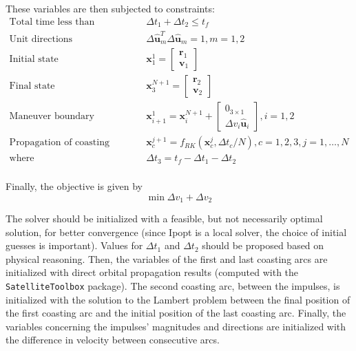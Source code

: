 These variables are then subjected to constraints:
\begin{align}
    \text{Total time less than transfer time} &\qquad\Delta t_1 + \Delta t_2 \leq t_f \\
    \text{Unit directions} &\qquad\Delta \hat{\mathbf{u}}_m^T \Delta \hat{\mathbf{u}}_m = 1, m = 1, 2 \\
    \text{Initial state} &\qquad \mathbf{x}_1^{1} = \begin{bmatrix}
        \mathbf{r}_1 \\ \mathbf{v}_1
    \end{bmatrix} \\
    \text{Final state} &\qquad \mathbf{x}_3^{N+1} = \begin{bmatrix}
        \mathbf{r}_2 \\ \mathbf{v}_2
    \end{bmatrix} \\
    \text{Maneuver boundary conditions} &\qquad \mathbf{x}_{i+1}^{1} = \mathbf{x}_i^{N+1} + \begin{bmatrix}
        0_{3\times1} \\ \Delta v_i \hat{\mathbf{u}}_i
    \end{bmatrix}, i=1, 2 \\
    \text{Propagation of coasting arcs} &\qquad \mathbf{x}_c^{j+1} = f_{RK}(\mathbf{x}_c^j, \Delta t_c / N), c=1, 2, 3, j=1,\dots,N \\
    \text{where} & \qquad \Delta t_3 = t_f - \Delta t_1 - \Delta t_2 \\
\end{align}

Finally, the objective is given by
\begin{equation}
    \min \Delta v_1 + \Delta v_2
\end{equation}

The solver should be initialized with a feasible, but not necessarily optimal solution, for better convergence (since Ipopt is a local solver, the choice of initial guesses is important). Values for \(\Delta t_1\) and \(\Delta t_2\) should be proposed based on physical reasoning. Then, the variables of the first and last coasting arcs are initialized with direct orbital propagation results (computed with the \texttt{SatelliteToolbox} package). The second coasting arc, between the impulses, is initialized with the solution to the Lambert problem between the final position of the first coasting arc and the initial position of the last coasting arc. Finally, the variables concerning the impulses' magnitudes and directions are initialized with the difference in velocity between consecutive arcs.